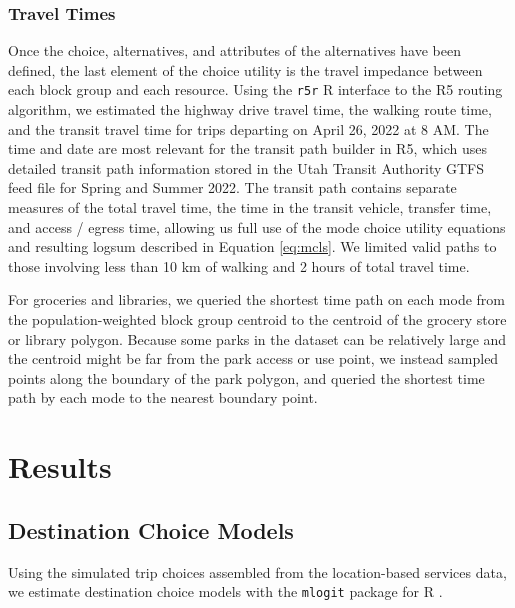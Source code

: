 \documentclass[3p, authoryear, review]{elsarticle} %
\begin{document}
\hypertarget{travel-times}{%
\subsubsection{Travel Times}\label{travel-times}}

Once the choice, alternatives, and attributes of the alternatives have been
defined, the last element of the choice utility is the travel impedance between
each block group and each resource. Using the \texttt{r5r} R interface \citep{r5r} to the R5
routing algorithm, we estimated the highway drive travel time, the walking
route time, and the transit travel time for trips departing on April 26,
2022 at 8 AM. The time and date are most relevant for the transit path builder
in R5, which uses detailed transit path information stored in the
Utah Transit Authority GTFS feed file for Spring and Summer 2022. The transit path contains
separate measures of the total travel time, the time in the transit vehicle,
transfer time, and access / egress time, allowing us full use of the
mode choice utility equations and resulting logsum described in Equation \eqref{eq:mcls}.
We limited valid paths to those involving less than 10 km of walking and
2 hours of total travel time.

For groceries and libraries, we queried the shortest time path on each
mode from the population-weighted block group centroid to the centroid of the grocery
store or library polygon. Because some parks in the dataset can be relatively
large and the centroid might be far from the park access or use point, we instead
sampled points along the boundary of the park polygon, and queried the shortest
time path by each mode to the nearest boundary point.

\hypertarget{results}{%
\section{Results}\label{results}}

\hypertarget{destination-choice-models}{%
\subsection{Destination Choice Models}\label{destination-choice-models}}

Using the simulated trip choices assembled from the location-based services data,
we estimate destination choice models with the \texttt{mlogit} package for
R \citep{R, mlogit}.
\end{document}
